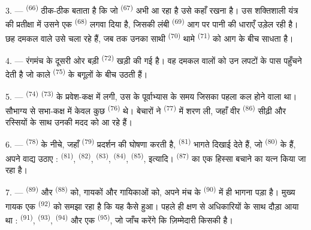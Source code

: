 3. ---  \textsuperscript{(66)} ठीक-ठीक बताता है कि जो
 \textsuperscript{(67)} अभी आ रहा है उसे कहाँ रखना है। उस
शक्तिशाली यंत्र की प्रतीक्षा में उसने एक  \textsuperscript{(68)}
लगवा दिया है, जिसकी लंबी  \textsuperscript{(69)} आग पर पानी की धाराएँ
उड़ेल रही है। छह दमकल वाले उसे चला रहे हैं, जब तक उनका साथी 
\textsuperscript{(70)} थामे  \textsuperscript{(71)} को आग के बीच साधता
है।

4. --- रंगमंच के दूसरी ओर बड़ी  \textsuperscript{(72)} खड़ी की गई
है। वह दमकल वालों को उन लपटों के पास पहुँचने देती है जो काले 
\textsuperscript{(75)} के बगूलों के बीच उठती हैं।

\VUsaut{5.0mm}
\VUsaut{3.4mm}

5. ---  \textsuperscript{(74)}  \textsuperscript{(73)} के
प्रवेश-कक्ष में लगी, उस  के पूर्वाभ्यास के समय जिसका पहला
 कल होने वाला था। सौभाग्य से सभा-कक्ष में केवल कुछ
 \textsuperscript{(76)} थे। बेचारों ने 
\textsuperscript{(77)} में शरण ली, जहाँ वीर  \textsuperscript{(86)}
सीढ़ी और रस्सियों के साथ उनकी मदद को आ रहे हैं।

6. ---  \textsuperscript{(78)} के नीचे, जहाँ
 \textsuperscript{(79)} प्रदर्शन की घोषणा करती है,
 \textsuperscript{(81)} भागते दिखाई देते हैं, जो
 \textsuperscript{(80)} के हैं, अपने वाद्य उठाए :
 \textsuperscript{(81)},  \textsuperscript{(82)},
 \textsuperscript{(83)},  \textsuperscript{(84)},
 \textsuperscript{(85)}, इत्यादि। 
\textsuperscript{(87)} का एक हिस्सा बचाने का यत्न किया जा रहा है।

7. ---  \textsuperscript{(89)} और 
\textsuperscript{(88)} को, गायकों और गायिकाओं को, अपने मंच के 
\textsuperscript{(90)} में ही भागना पड़ा है। मुख्य गायक एक 
\textsuperscript{(92)} को समझा रहा है कि यह कैसे हुआ।  पहले ही
क्षण से अधिकारियों के साथ दौड़ा आया था :  \textsuperscript{(91)},
 \textsuperscript{(93)}, 
\textsuperscript{(94)} और एक  \textsuperscript{(95)}, जो जाँच
करेंगे कि ज़िम्मेदारी किसकी है।
\VUsaut{6.0mm}
\VUfilet{22mm}

